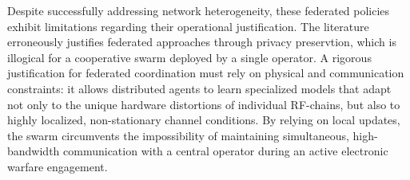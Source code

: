 \documentclass[conference]{IEEEtran}
\newcommand{\adm}[1]{{\color{orange}{[#1]}}}
\begin{document}
Despite successfully addressing network heterogeneity, these federated policies exhibit limitations regarding their operational justification.
The literature erroneously justifies federated approaches through privacy preservtion, which is illogical for a cooperative swarm deployed by a single operator. 
A rigorous justification for federated coordination must rely on physical and communication constraints: it allows distributed agents to learn specialized models that adapt not only to the unique hardware distortions of individual RF-chains, but also to highly localized, non-stationary channel conditions.
By relying on local updates, the swarm circumvents the impossibility of maintaining simultaneous, high-bandwidth communication with a central operator during an active electronic warfare engagement.
\end{document}
